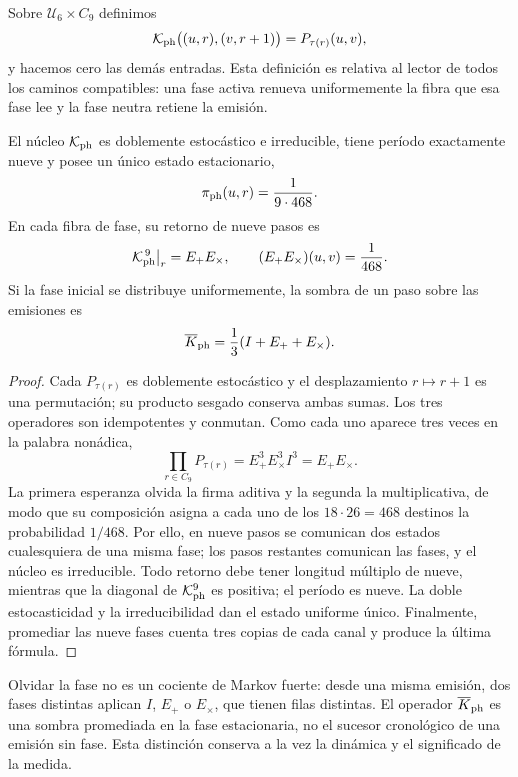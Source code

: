 \begin{definition}
\label{def:transferencia-tpk-fase}
Sobre \(\mathcal U_6\times C_9\) definimos
\[
 \mathcal K_{\rm ph}\bigl((u,r),(v,r+1)\bigr)
 =P_{\tau(r)}(u,v),
\]
y hacemos cero las demás entradas. Esta definición es relativa al lector de
todos los caminos compatibles: una fase activa renueva uniformemente la fibra
que esa fase lee y la fase neutra retiene la emisión.
\end{definition}

\begin{theorem}
\label{thm:retorno-nonadico-uniforme}
El núcleo \(\mathcal K_{\rm ph}\) es doblemente estocástico e irreducible,
tiene período exactamente nueve y posee un único estado estacionario,
\[
 \pi_{\rm ph}(u,r)=\frac1{9\cdot468}.
\]
En cada fibra de fase, su retorno de nueve pasos es
\[
 \mathcal K_{\rm ph}^{\,9}\big|_r=E_+E_\times,
 \qquad
 (E_+E_\times)(u,v)=\frac1{468}.
\]
Si la fase inicial se distribuye uniformemente, la sombra de un paso sobre
las emisiones es
\[
 \overline K_{\rm ph}=\frac13(I+E_++E_\times).
\]
\end{theorem}

\begin{proof}
Cada \(P_{\tau(r)}\) es doblemente estocástico y el desplazamiento
\(r\mapsto r+1\) es una permutación; su producto sesgado conserva ambas sumas.
Los tres operadores son idempotentes y conmutan. Como cada uno aparece tres
veces en la palabra nonádica,
\[
 \prod_{r\in C_9}P_{\tau(r)}
 =E_+^3E_\times^3I^3=E_+E_\times.
\]
La primera esperanza olvida la firma aditiva y la segunda la multiplicativa,
de modo que su composición asigna a cada uno de los \(18\cdot26=468\)
destinos la probabilidad \(1/468\). Por ello, en nueve pasos se comunican dos
estados cualesquiera de una misma fase; los pasos restantes comunican las
fases, y el núcleo es irreducible. Todo retorno debe tener longitud múltiplo
de nueve, mientras que la diagonal de \(\mathcal K_{\rm ph}^9\) es positiva;
el período es nueve. La doble estocasticidad y la irreducibilidad dan el
estado uniforme único. Finalmente, promediar las nueve fases cuenta tres
copias de cada canal y produce la última fórmula.
\end{proof}

Olvidar la fase no es un cociente de Markov fuerte: desde una misma emisión,
dos fases distintas aplican \(I\), \(E_+\) o \(E_\times\), que tienen filas
distintas. El operador \(\overline K_{\rm ph}\) es una sombra promediada en la
fase estacionaria, no el sucesor cronológico de una emisión sin fase. Esta
distinción conserva a la vez la dinámica y el significado de la medida.

